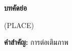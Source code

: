 \thispagestyle{empty}
\vspace{2 cm}
{\huge \bf บทคัดย่อ}

\vspace{2 cm}
(PLACE)

\vspace{1 cm}
{\bf{คำสำคัญ:}} การต่อเติมภาพ\\
\newpage